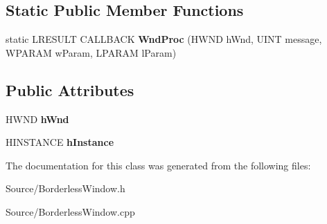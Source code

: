 \subsection*{Static Public Member Functions}
\begin{DoxyCompactItemize}
\item 
\hypertarget{class_borderless_window_a8e85122ab76895d618b6d20cfea4e638}{}static L\+R\+E\+S\+U\+L\+T C\+A\+L\+L\+B\+A\+C\+K {\bfseries Wnd\+Proc} (H\+W\+N\+D h\+Wnd, U\+I\+N\+T message, W\+P\+A\+R\+A\+M w\+Param, L\+P\+A\+R\+A\+M l\+Param)\label{class_borderless_window_a8e85122ab76895d618b6d20cfea4e638}

\end{DoxyCompactItemize}
\subsection*{Public Attributes}
\begin{DoxyCompactItemize}
\item 
\hypertarget{class_borderless_window_a146cbc139949df802e47fb0fc7216533}{}H\+W\+N\+D {\bfseries h\+Wnd}\label{class_borderless_window_a146cbc139949df802e47fb0fc7216533}

\item 
\hypertarget{class_borderless_window_aac4d2622efa20dfe67500c92102682d9}{}H\+I\+N\+S\+T\+A\+N\+C\+E {\bfseries h\+Instance}\label{class_borderless_window_aac4d2622efa20dfe67500c92102682d9}

\end{DoxyCompactItemize}


The documentation for this class was generated from the following files\+:\begin{DoxyCompactItemize}
\item 
Source/Borderless\+Window.\+h\item 
Source/Borderless\+Window.\+cpp\end{DoxyCompactItemize}
